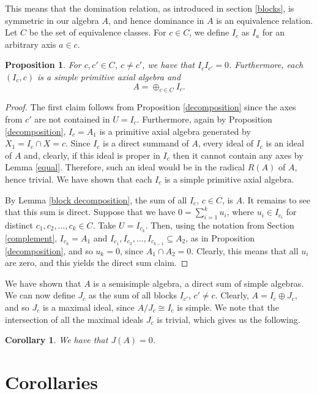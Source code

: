 \documentclass[12pt]{article}
\newtheorem{proposition}[theorem]{Proposition}
\newtheorem{corollary}[theorem]{Corollary}
\begin{document}
This means that the domination relation, as introduced in section \ref{blocks}, 
is symmetric in our algebra $A$, and hence dominance in $A$ is an equivalence 
relation. Let $C$ be the set of equivalence classes. For $c\in C$, we define $I_c$ 
as $I_a$ for an arbitrary axis $a\in c$.

\begin{proposition} \label{semisimple}
For $c,c'\in C$, $c\neq c'$, we have that $I_cI_{c'}=0$. Furthermore, each $(I_c,c)$ 
is a simple primitive axial algebra and 
%
$$
A=\oplus_{c\in C}I_c.
$$
\end{proposition}

\begin{proof}
The first claim follows from Proposition \ref{decomposition} since the axes from $c'$ 
are not contained in $U=I_c$. Furthermore, again by Proposition \ref{decomposition}, 
$I_c=A_1$ is a primitive axial algebra generated by $X_1=I_c\cap X=c$. Since $I_c$ is 
a direct summand of $A$, every ideal of $I_c$ is an ideal of $A$ and, clearly, if 
this ideal is proper in $I_c$ then it cannot contain any axes by Lemma \ref{equal}. 
Therefore, such an ideal would be in the radical $R(A)$ of $A$, hence trivial. We 
have shown that each $I_c$ is a simple primitive axial algebra.

By Lemma \ref{block decomposition}, the sum of all $I_c$, $c\in C$, is $A$. It 
remains to see that this sum is direct. Suppose that we have $0=\sum_{i=1}^k u_i$, 
where $u_i\in I_{c_i}$ for distinct $c_1,c_2,\ldots,c_k\in C$. Take $U=I_{c_k}$. 
Then, using the notation from Section \ref{complement}, $I_{c_k}=A_1$ and 
$I_{c_1},I_{c_2},\ldots,I_{c_{k-1}}\subseteq A_2$, as in Proposition \ref{decomposition}, 
and so $u_k=0$, since $A_1\cap A_2=0$. Clearly, this means that all $u_i$ are zero, 
and this yields the direct sum claim.
\end{proof}

We have shown that $A$ is a semisimple algebra, a direct sum of simple algebras.
We can now define $J_c$ as the sum of all blocks $I_{c'}$, $c'\neq c$. Clearly, 
$A=I_c\oplus J_c$, and so $J_c$ is a maximal ideal, since $A/J_c\cong I_c$ is simple. 
We note that the intersection of all the maximal ideals $J_c$ is trivial, which gives 
us the following.

\begin{corollary} \label{trivial Jacobson}
We have that $J(A)=0$.
\end{corollary}

\section{Corollaries}
\end{document}
